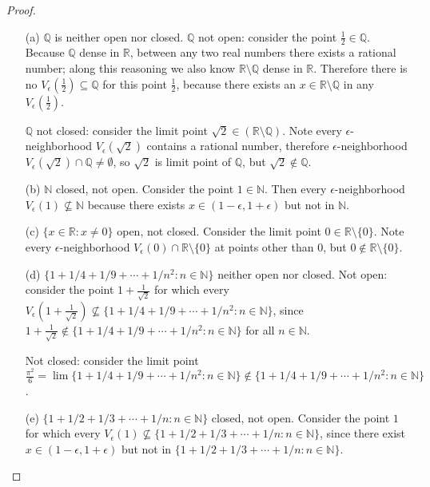 \documentclass[11pt,twoside, reqno]{amsart}
\theoremstyle{remark}
\def\R{\mathbb R}
\def\Q{\mathbb Q}
\def\N{\mathbb N}
\begin{document}
\begin{proof}
\begin{enumerate}
    \item [(a)] $\Q$ is neither open nor closed. $\Q$ not open: consider the point $\frac{1}{2}\in \Q$. Because $\Q$ dense in $\R$, between any two real numbers there exists a rational number; along this reasoning we also know $\R \setminus \Q$ dense in $\R$. Therefore there is no $V_\epsilon(\frac{1}{2}) \subseteq \Q$ for this point $\frac{1}{2}$, because there exists an $x \in \R \setminus \Q$ in any $V_\epsilon(\frac{1}{2})$. 
    
    $\Q$ not closed: consider the limit point $\sqrt{2} \in (\R \setminus \Q)$. Note every $\epsilon$-neighborhood $V_\epsilon(\sqrt{2})$ contains a rational number, therefore $\epsilon$-neighborhood $V_\epsilon(\sqrt{2}) \cap \Q \neq \emptyset$, so $\sqrt{2}$ is limit point of $\Q$, but $\sqrt{2} \not \in \Q$.
    \item [(b)] $\N$ closed, not open. Consider the point $1 \in \N$. Then every $\epsilon$-neighborhood $V_\epsilon(1) \not \subseteq \N$ because there exists $x \in (1-\epsilon, 1+\epsilon)$ but not in $\N$.
    \item [(c)] $\{x \in \R : x \neq 0\}$ open, not closed. Consider the limit point $0 \in \R \setminus \{0\}$. Note every $\epsilon$-neighborhood $V_\epsilon(0) \cap \R \setminus \{0\}$ at points other than $0$, but $0 \not \in \R \setminus \{0\}$.
    \item [(d)] $\{1 + 1/4 + 1/9 + \cdots + 1/n^2 : n \in \N\}$ neither open nor closed. Not open: consider the point $1 + \frac{1}{\sqrt{2}}$ for which every $V_\epsilon(1+\frac{1}{\sqrt{2}}) \not \subseteq \{1 + 1/4 + 1/9 + \cdots + 1/n^2 : n \in \N\}$, since $1 + \frac{1}{\sqrt{2}} \not \in \{1 + 1/4 + 1/9 + \cdots + 1/n^2 : n \in \N\}$ for all $n \in \N$. 
    
    Not closed: consider the limit point $\frac{\pi^2}{6} = \lim \{1 + 1/4 + 1/9 + \cdots + 1/n^2 : n \in \N\} \not \in \{1 + 1/4 + 1/9 + \cdots + 1/n^2 : n \in \N\}$.
    \item [(e)] $\{1 + 1/2 + 1/3 + \cdots + 1/n : n \in \N\}$ closed, not open. Consider the point $1$ for which every $V_\epsilon(1) \not \subseteq \{1 + 1/2 + 1/3 + \cdots + 1/n : n \in \N\}$, since there exist $x \in (1-\epsilon, 1+\epsilon)$ but not in $\{1 + 1/2 + 1/3 + \cdots + 1/n : n \in \N\}$.
\end{enumerate}

\end{proof}
\end{document}
